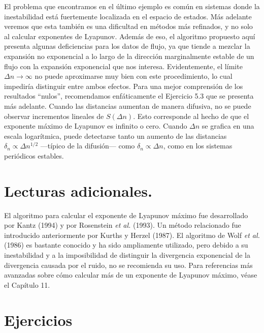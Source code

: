 \documentclass[10pt,a4paper]{book}
\begin{document}
\bigskip

El problema que encontramos en el último ejemplo es común en sistemas donde la inestabilidad está fuertemente localizada en el espacio de estados. Más adelante veremos que esta también es una dificultad en métodos más refinados, y no solo al calcular exponentes de Lyapunov. Además de eso, el algoritmo propuesto aquí presenta algunas deficiencias para los datos de flujo, ya que tiende a mezclar la expansión no exponencial a lo largo de la dirección marginalmente estable de un flujo con la expansión exponencial que nos interesa. Evidentemente, el límite $\Delta n \to \infty$ no puede aproximarse muy bien con este procedimiento, lo cual impediría distinguir entre ambos efectos. Para una mejor comprensión de los resultados “nulos”, recomendamos enfáticamente el Ejercicio 5.3 que se presenta más adelante. Cuando las distancias aumentan de manera difusiva, no se puede observar incrementos lineales de $S(\Delta n)$. Esto corresponde al hecho de que el exponente máximo de Lyapunov es infinito o cero. Cuando $\Delta n$ se grafica en una escala logarítmica, puede detectarse tanto un aumento de las distancias $\delta_n \propto \Delta n^{1/2}$ —típico de la difusión— como $\delta_n \propto \Delta n$, como en los sistemas periódicos estables.

\section*{Lecturas adicionales.}  
El algoritmo para calcular el exponente de Lyapunov máximo fue desarrollado por Kantz (1994) y por Rosenstein \textit{et al.} (1993). Un método relacionado fue introducido anteriormente por Kurths y Herzel (1987). El algoritmo de Wolf \textit{et al.} (1986) es bastante conocido y ha sido ampliamente utilizado, pero debido a su inestabilidad y a la imposibilidad de distinguir la divergencia exponencial de la divergencia causada por el ruido, no se recomienda su uso. Para referencias más avanzadas sobre cómo calcular más de un exponente de Lyapunov máximo, véase el Capítulo 11.

\newpage

\section{Ejercicios}
\end{document}
